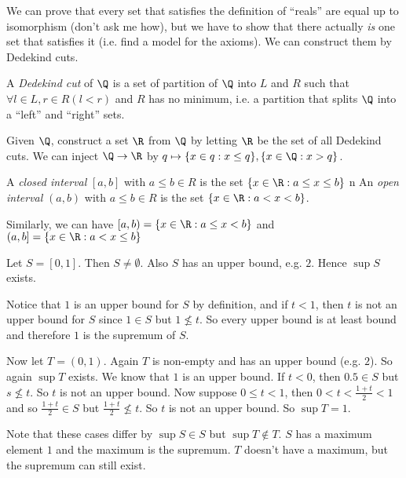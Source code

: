 \documentclass[a4paper]{article}
\begin{document}
  We can prove that every set that satisfies the definition of ``reals'' are equal up to isomorphism (don't ask me how), but we have to show that there actually \emph{is} one set that satisfies it (i.e. find a model for the axioms). We can construct them by Dedekind cuts.

  \begin{defi}
    A \emph{Dedekind cut} of $\Q$ is a set of partition of $\Q$ into $L$ and $R$ such that $\forall l\in L, r\in R(l < r)$ and $R$ has no minimum, i.e. a partition that splits $\Q$ into a ``left'' and ``right'' sets.
  \end{defi}

  Given $\Q$, construct a set $\R$ from $\Q$ by letting $\R$ be the set of all Dedekind cuts. We can inject $\Q\to \R$ by $q\mapsto \{x\in q: x \leq q\}, \{x\in \Q: x> q\}$. 

  \begin{defi}
    A \emph{closed interval} $[a, b]$ with $a \leq b\in R$ is the set $\{x\in \R: a\leq x\leq b\}$
    n  An \emph{open interval} $(a, b)$ with $a \leq b\in R$ is the set $\{x\in \R: a< x< b\}$.
  \end{defi}

  Similarly, we can have $[a, b) = \{x\in \R: a\leq x < b\}$ and $(a, b] = \{x\in \R: a< x \leq b\}$

  \begin{eg}
    Let $S = [0, 1]$. Then $S\not= \emptyset$. Also $S$ has an upper bound, e.g. $2$. Hence $\sup S$ exists.

    Notice that $1$ is an upper bound for $S$ by definition, and if $t < 1$, then $t$ is not an upper bound for $S$ since $1\in S$ but $1\not\leq t$. So every upper bound is at least bound and therefore $1$ is the supremum of $S$. 

    Now let $T = (0, 1)$. Again $T$ is non-empty and has an upper bound (e.g. $2$). So again $\sup T$ exists. We know that $1$ is an upper bound. If $t < 0$, then $0.5\in S$ but $s\not\leq t$. So $t$ is not an upper bound. Now suppose $0\leq t < 1$, then $0 < t < \frac{1 + t}{2} < 1$ and so $\frac{1 + t}{2}\in S$ but $\frac{1 + t}{2} \not\leq t$. So $t$ is not an upper bound. So $\sup T = 1$.

    Note that these cases differ by $\sup S\in S$ but $\sup T\not\in T$. $S$ has a maximum element $1$ and the maximum is the supremum. $T$ doesn't have a maximum, but the supremum can still exist.

  \end{eg}
\end{document}
